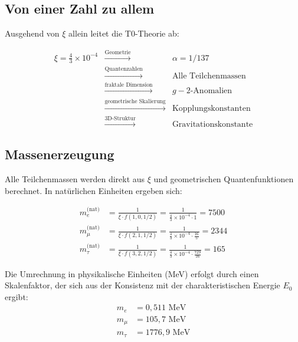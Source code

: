 \documentclass[12pt,a4paper]{article}
\theoremstyle{definition}
\begin{document}
	\subsection{Von einer Zahl zu allem}
	
	Ausgehend von $\xi$ allein leitet die T0-Theorie ab:
	
	\begin{equation}
		\begin{array}{rcl}
			\xi = \frac{4}{3} \times 10^{-4} & \xrightarrow{\text{Geometrie}} & \alpha = 1/137\\
			& \xrightarrow{\text{Quantenzahlen}} & \text{Alle Teilchenmassen}\\
			& \xrightarrow{\text{fraktale Dimension}} & g-2\text{-Anomalien}\\
			& \xrightarrow{\text{geometrische Skalierung}} & \text{Kopplungskonstanten}\\
			& \xrightarrow{\text{3D-Struktur}} & \text{Gravitationskonstante}
		\end{array}
	\end{equation}
	
	\subsection{Massenerzeugung}
	
	Alle Teilchenmassen werden direkt aus $\xi$ und geometrischen Quantenfunktionen berechnet. In natürlichen Einheiten ergeben sich:
	
	\begin{align}
		m_e^{\text{(nat)}} &= \frac{1}{\xi \cdot f(1,0,1/2)} = \frac{1}{\frac{4}{3} \times 10^{-4} \cdot 1} = 7500 \\
		m_\mu^{\text{(nat)}} &= \frac{1}{\xi \cdot f(2,1,1/2)} = \frac{1}{\frac{4}{3} \times 10^{-4} \cdot \frac{16}{5}} = 2344 \\
		m_\tau^{\text{(nat)}} &= \frac{1}{\xi \cdot f(3,2,1/2)} = \frac{1}{\frac{4}{3} \times 10^{-4} \cdot \frac{729}{16}} = 165
	\end{align}
	
	Die Umrechnung in physikalische Einheiten (MeV) erfolgt durch einen Skalenfaktor, der sich aus der Konsistenz mit der charakteristischen Energie $E_0$ ergibt:
	\begin{align}
		m_e &= 0,511 \text{ MeV} \\
		m_\mu &= 105,7 \text{ MeV} \\
		m_\tau &= 1776,9 \text{ MeV}
	\end{align}
	
\end{document}
